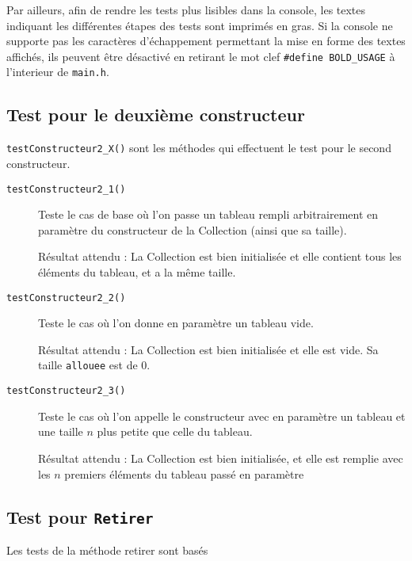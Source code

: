 \documentclass[11pt]{article}
\begin{document}
Par ailleurs, afin de rendre les tests plus lisibles dans la console, les textes indiquant les différentes étapes des tests sont imprimés en gras. Si la console ne supporte pas les caractères d'échappement permettant la mise en forme des textes affichés, ils peuvent être désactivé en retirant le mot clef \texttt{\#define~BOLD\_USAGE} à l'interieur de \texttt{main.h}.
\subsection{Test pour le deuxième constructeur}
\texttt{testConstructeur2\_X()} sont les méthodes qui effectuent le test pour le second constructeur. 
\begin{description}
	\item[\texttt{testConstructeur2\_1()}] Teste le cas de base où l'on passe un tableau rempli arbitrairement en paramètre du constructeur de la Collection (ainsi que sa taille).
	
	Résultat attendu : La Collection est bien initialisée et elle contient tous les éléments du tableau, et a la même taille.
	
	\item[\texttt{testConstructeur2\_2()}] Teste le cas où l'on donne en paramètre un tableau vide.
	
	Résultat attendu : La Collection est bien initialisée et elle est vide. Sa taille \texttt{allouee} est de 0.
	
	\item[\texttt{testConstructeur2\_3()}] Teste le cas où l'on appelle le constructeur avec en paramètre un tableau et une taille $n$ plus petite que celle du tableau.
	
	Résultat attendu : La Collection est bien initialisée, et elle est remplie avec les $n$ premiers éléments du tableau passé en paramètre 
\end{description}

\subsection{Test pour \tt Retirer}
Les tests de la méthode retirer sont basés
\end{document}
